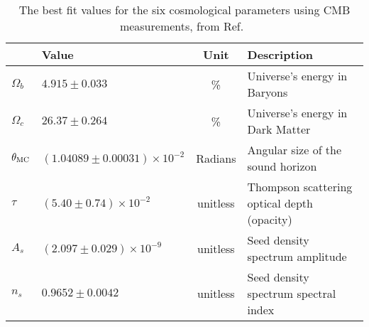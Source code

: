%   

\begin{table}[b]
  \centering
  \begin{tabular}{llcl}
               & \textbf{Value}                 & \textbf{Unit} & \textbf{Description} \\
    \hline 
    $\Omega_b$ & $ 4.915  \pm0.033                 $ & \%       & Universe's energy in Baryons \\
    $\Omega_c$ & $ 26.37  \pm0.264                 $ & \%       & Universe's energy in Dark Matter \\
    $\theta_{\textrm{MC}}$ & $(1.04089\pm0.00031)\times 10^{-2}$ & Radians  & Angular size of the sound horizon \\
    $\tau$     & $(5.40   \pm0.74   )\times 10^{-2}$ & unitless & Thompson scattering optical depth (opacity)\\
    $A_s$      & $(2.097  \pm0.029  )\times 10^{-9}$ & unitless & Seed density spectrum amplitude \\
    $n_s$      & $ 0.9652 \pm0.0042                $ & unitless & Seed density spectrum spectral index \\
    \hline 
  \end{tabular}
  \caption[6 Cosmological Parameters]{
    The best fit values for the six cosmological parameters using CMB measurements, from Ref.~\cite{planck_dm_limit}}
  \label{tab:six_params}
\end{table}

